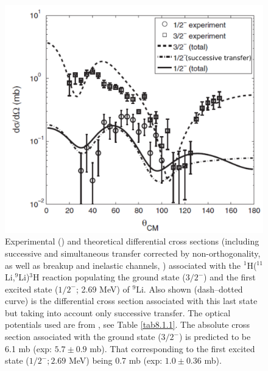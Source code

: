  \begin{figure}
 	\centerline{\includegraphics*[width=12cm,angle=0]{C8/figsC8/fig8_B_2}}
 	\caption{Experimental (\cite{Tanihata:08}) and theoretical differential cross sections (including successive and simultaneous  transfer corrected by non-orthogonality, as well as breakup and inelastic channels, \cite{Potel:10})  associated with the
 		$^1$H($^{11}$Li,$^9$Li)$^3$H  reaction populating the ground state ($3/2^-$) and the first excited state ($1/2^-$; 2.69 MeV) of $^{9}$Li. Also shown (dash--dotted curve) is the differential cross section associated with this last state but taking into account only successive transfer. The optical potentials used are from \citep{Tanihata:08,An:06}, see Table \ref{tab8.1.1}. The absolute cross section associated with the ground state ($3/2^-$) is predicted to be 6.1 mb (exp: $5.7\pm 0.9$ mb). That corresponding to the first excited state ($1/2^-; 2.69$ MeV) being 0.7 mb (exp: $1.0\pm 0.36$ mb). }\label{fig8_B_2}
 \end{figure}
